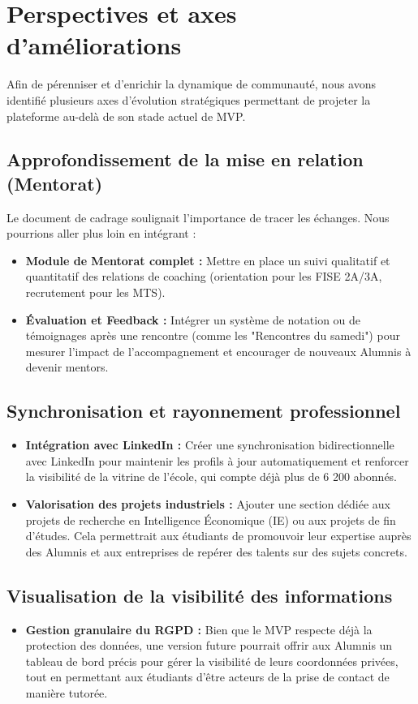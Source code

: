 \documentclass[a4paper,12pt]{article}
\begin{document}
\newpage

\section{Perspectives et axes d’améliorations}
Afin de pérenniser et d'enrichir la dynamique de communauté, nous avons identifié plusieurs axes d’évolution stratégiques permettant de projeter la plateforme au-delà de son stade actuel de MVP.

\subsection{Approfondissement de la mise en relation (Mentorat)}
Le document de cadrage soulignait l'importance de tracer les échanges. Nous pourrions aller plus loin en intégrant :
\begin{itemize}[label=\textbullet, itemsep=5pt]
    \item \textbf{Module de Mentorat complet :} Mettre en place un suivi qualitatif et quantitatif des relations de coaching (orientation pour les FISE 2A/3A, recrutement pour les MTS).
    \item \textbf{Évaluation et Feedback :} Intégrer un système de notation ou de témoignages après une rencontre (comme les "Rencontres du samedi") pour mesurer l'impact de l'accompagnement et encourager de nouveaux Alumnis à devenir mentors.
\end{itemize}

\subsection{Synchronisation et rayonnement professionnel}
\begin{itemize}[label=\textbullet, itemsep=5pt]
    \item \textbf{Intégration avec LinkedIn :} Créer une synchronisation bidirectionnelle avec LinkedIn pour maintenir les profils à jour automatiquement et renforcer la visibilité de la vitrine de l'école, qui compte déjà plus de 6 200 abonnés.
    \item \textbf{Valorisation des projets industriels :} Ajouter une section dédiée aux projets de recherche en Intelligence Économique (IE) ou aux projets de fin d'études. Cela permettrait aux étudiants de promouvoir leur expertise auprès des Alumnis et aux entreprises de repérer des talents sur des sujets concrets.
\end{itemize}

\subsection{Visualisation de la visibilité des informations}
\begin{itemize}[label=\textbullet, itemsep=5pt]
    \item \textbf{Gestion granulaire du RGPD :} Bien que le MVP respecte déjà la protection des données, une version future pourrait offrir aux Alumnis un tableau de bord précis pour gérer la visibilité de leurs coordonnées privées, tout en permettant aux étudiants d'être acteurs de la prise de contact de manière tutorée.
\end{itemize}
\end{document}
